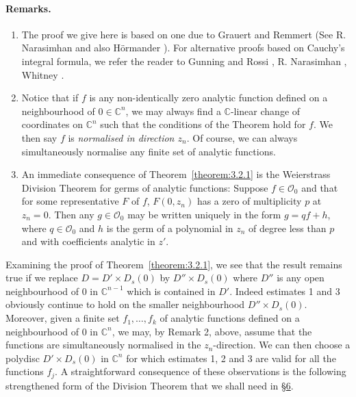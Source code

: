 \paragraph*{Remarks.}
\begin{enumerate}
\item The proof we give here is based on one due to Grauert and Remmert (See R. Narasimhan \cite{bib:I:narasimhan-r:3} and also H\"ormander \cite{bib:I:hormander-l:1}). For alternative proofs based on Cauchy's integral formula, we refer the reader to Gunning and Rossi \cite{bib:I:gunning-r-c-and-rossi-h:1}, R. Narasimhan \cite{bib:I:narasimhan-r:3}, Whitney \cite{bib:I:whitney-h:1}.
\item Notice that if $f$ is any non-identically zero analytic function defined on a neighbourhood of $0\in\mathbb C^n$, we may always find a $\mathbb C$-linear change of coordinates on $\mathbb C^n$ such that the conditions of the Theorem hold for $f$. We then say $f$ is \emph{normalised in direction $z_n$}. Of course, we can always simultaneously normalise any finite set of analytic functions.
\item An immediate consequence of Theorem~\ref{theorem:3.2.1} is the Weierstrass Division Theorem for germs of analytic functions: Suppose $f\in\mathcal O_0$ and that for some representative $F$ of $f$, $F(0,z_n)$ has a zero of multiplicity $p$ at $z_n=0$. Then any $g\in\mathcal O_0$ may be written uniquely in the form $g=qf+h$, where $q\in\mathcal O_0$ and $h$ is the germ of a polynomial in $z_n$ of degree less than $p$ and with coefficients analytic in $z'$.
\end{enumerate}
Examining the proof of Theorem~\ref{theorem:3.2.1}, we see that the result remains true if we replace $D=D'\times D_s(0)$ by $D''\times D_s(0)$ where $D''$ is any open neighbourhood of $0$ in $\mathbb C^{n-1}$ which is contained in $D'$. Indeed estimates 1 and 3 obviously continue to hold on the smaller neighbourhood $D''\times D_s(0)$. Moreover, given a finite set $f_1,\ldots,f_k$ of analytic functions defined on a neighbourhood of $0$ in $\mathbb C^n$, we may, by Remark 2, above, assume that the functions are simultaneously normalised in the $z_n$-direction. We can then choose a polydisc $D'\times D_s(0)$ in $\mathbb C^n$ for which estimates 1, 2 and 3 are valid for all the functions $f_j$. A straightforward consequence of these observations is the following strengthened form of the Division Theorem that we shall need in \hyperref[sec:3:6]{\S6}.
